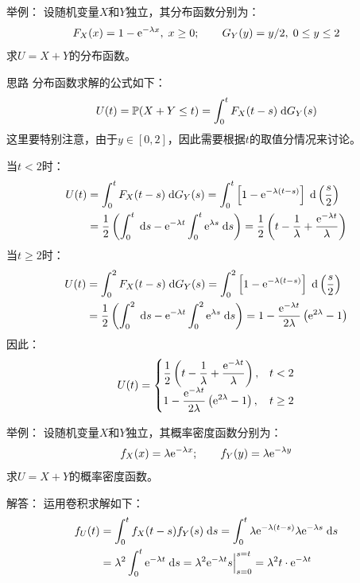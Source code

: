 \documentclass[t]{beamer}
\newcommand{\dif}{{\;\rm d}}
\renewcommand{\Pr}{\mathbb{P}}
\begin{document}
  \begin{frame}{举例：}
    设随机变量$X$和$Y$独立，其{分布函数}分别为：
    $$F_X(x)=1-{\rm e}^{-\lambda x},\; x\ge0; \qquad
    G_Y(y)=y/2,\; 0\le y\le 2$$
    求$U=X+Y$的{分布函数}。
  
\begin{block}{思路}
  分布函数求解的公式如下：
\[U(t)=\Pr(X+Y\le t)=\int^t_0 F_X(t-s)\dif G_Y(s)\]
这里要特别注意，由于$y\in [0,2]$，因此需要根据$t$的取值分情况来讨论。
\end{block}

  \end{frame}


  \begin{frame}{}
    当$t<2$时：
    \[\begin{split}
  U(t)&=\int^t_0 F_X(t-s)\dif G_Y(s)=\int^t_0 \left[1-{\rm
  e}^{-\lambda(t-s)}\right] \dif\left( \frac{s}{2}\right)
  \\&=\frac{1}{2}\left(\int^t_0\dif s-{\rm e}^{-\lambda t}\int^t_0
  {\rm e}^{\lambda s}\dif s
  \right)=\frac{1}{2}\left(t-\frac{1}{\lambda}+\frac{{\rm
  e}^{-\lambda t}}{\lambda}\right)
    \end{split} \] 
  当$t\ge 2$时：
    \[\begin{split}
  U(t)&=\int^2_0 F_X(t-s)\dif G_Y(s)=\int^2_0 \left[1-{\rm
  e}^{-\lambda(t-s)}\right] \dif\left( \frac{s}{2}\right)
  \\&=\frac{1}{2}\left(\int^2_0\dif s-{\rm e}^{-\lambda t}\int^2_0
  {\rm e}^{\lambda s}\dif s \right)=1-\frac{{\rm e}^{-\lambda
  t}}{2\lambda}\left({\rm e}^{2\lambda}-1\right)
    \end{split} \] 	
  因此：\[U(t)=\begin{cases}
  \displaystyle\frac{1}{2}\left(t-\frac{1}{\lambda}+\frac{{\rm e}^{-\lambda
  t}}{\lambda}\right),& t<2\\
  \displaystyle 1-\frac{{\rm e}^{-\lambda t}}{2\lambda}\left({\rm
  e}^{2\lambda}-1\right) ,& t\ge 2
  \end{cases}\]
  
  \end{frame}
  
  \begin{frame}{举例：}
    设随机变量$X$和$Y$独立，其{概率密度函数}分别为：
    $$f_X(x)=\lambda {\rm e}^{-\lambda x}; \qquad f_Y(y)=\lambda
    {\rm e}^{-\lambda y}$$
    求$U=X+Y$的{概率密度函数}。
  
    \begin{block}{解答：}
      运用卷积求解如下：
    \[\begin{split}
    f_U(t)&=\int^t_0 f_X(t-s) f_Y(s)\dif s=\int^t_0 \lambda {\rm
    e}^{-\lambda (t-s)}\lambda {\rm e}^{-\lambda s}\dif s\\
    &=\lambda^2\int^t_0 {\rm e}^{-\lambda t}\dif s=\lambda^2 {\rm
    e}^{-\lambda t}s\Big|^{s=t}_{s=0}=\lambda^2 t \cdot {\rm
    e}^{-\lambda t}
    \end{split} \] 
    \end{block}
  \end{frame}
\end{document}
